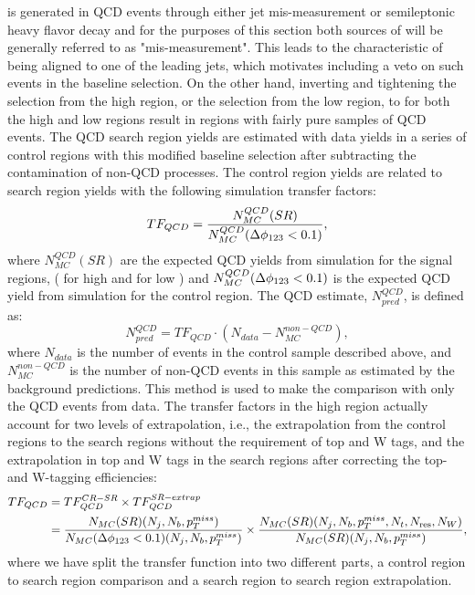 \met{} is generated in QCD events through either jet \pt{} mis-measurement or semileptonic heavy flavor decay and for the purposes of this section both sources of \met{} will be generally referred to as "mis-measurement". This leads to the characteristic of \met{} being aligned to one of the leading jets, which motivates including a veto on such events in the baseline selection. On the other hand, inverting and tightening the \highdm{} selection from the high \dm{} region, or the \lowdm{} selection from the low \dm{} region, to \qcdcr{} for both the high and low \dm{} regions result in regions with fairly pure samples of QCD events. The QCD search region yields are estimated with data yields in a series of control regions with this modified baseline selection after subtracting the contamination of non-QCD processes. The control region yields are related to search region yields with the following simulation transfer factors:
\begin{equation}\label{QCDTF}
TF_{QCD}=\frac{N_{MC}^{QCD}(SR)}{N_{MC}^{QCD}(\Delta\phi_{123}<0.1)},
\end{equation}
where $N_{MC}^{QCD}(SR)$ are the expected QCD yields from simulation for the signal regions, (\highdm{} for high \dm{} and \lowdm{} for low \dm) and $N_{MC}^{QCD}(\Delta\phi_{123}<0.1)$ is the expected QCD yield from simulation for the control region. The QCD estimate, $N_{pred}^{QCD}$, is defined as:
\begin{equation}
N_{pred}^{QCD}=TF_{QCD}\cdot(N_{data}-N_{MC}^{non-QCD}),
\end{equation}
where $N_{data}$ is the number of events in the \qcdcr{} control sample described above, and $N_{MC}^{non-QCD}$ is the number of non-QCD events in this sample as estimated by the background predictions. This method is used to make the comparison with only the QCD events from data. The transfer factors in the high \dm{} region actually account for two levels of extrapolation, i.e., the extrapolation from the control regions to the search regions without the requirement of top and W tags, and the extrapolation in top and W tags in the search regions after correcting the top- and W-tagging efficiencies:
\begin{equation}\label{QCDTFExtrapolation}
\begin{split}
TF_{QCD}&=TF_{QCD}^{CR-SR}\times TF_{QCD}^{SR-extrap} \\
&=\frac{N_{MC}(SR)(N_{j},N_{b},p_{T}^{miss})}{N_{MC}(\Delta\phi_{123}<0.1)(N_{j},N_{b},p_{T}^{miss})}\times\frac{N_{MC}(SR)(N_{j},N_{b},p_{T}^{miss},N_{t},N_{\text{res}},N_{W})}{N_{MC}(SR)(N_{j},N_{b},p_{T}^{miss})},
\end{split}
\end{equation}
where we have split the transfer function into two different parts, a control region to search region comparison and a search region to search region extrapolation.

